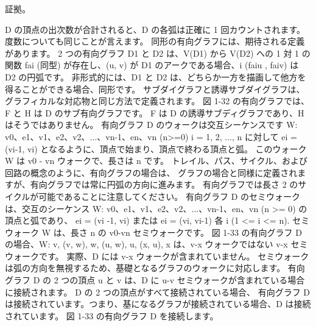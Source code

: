 
証拠。

D の頂点の出次数が合計されると、D の各弧は正確に 1 回カウントされます。 度数についても同じことが言えます。
同形の有向グラフには、期待される定義があります。 2 つの有向グラフ D1 と D2 は、V(D1) から V(D2) への 
1 対 1 の関数 fai (同型) が存在し、(u, v) が D1 のアークである場合、i (faiu , faiv) は D2 の円弧です。 
非形式的には、D1 と D2 は、どちらか一方を描画して他方を得ることができる場合、同形です。
サブダイグラフと誘導サブダイグラフは、グラフィカルな対応物と同じ方法で定義されます。 図 1-32 の有向グラフでは、F と H は D のサブ有向グラフです。 
F は D の誘導サブディグラフであり、H はそうではありません。
有向グラフ D のウォークは交互シーケンスです
W: v0、e1、v1、e2、v2、...、vn-1、en、vn (n>=0)
i = 1, 2, ..., n に対して ei = (vi-1, vi) となるように、頂点で始まり、頂点で終わる頂点と弧。 
このウォーク W は v0 - vn ウォークで、長さは n です。 トレイル、パス、サイクル、および回路の概念のように、有向グラフの場合は、
グラフの場合と同様に定義されますが、有向グラフでは常に円弧の方向に進みます。 有向グラフでは長さ 2 のサイクルが可能であることに注意してください。 
有向グラフ D のセミウォークは、交互のシーケンス W: v0、e1、v1、e2、v2、...、vn-1、en、vn (n >= 0) の頂点と弧であり、
ei = (vi -1, vi) または ei = (vi, vi-1) 各 i (1 <= i <= n). セミウォーク W は、長さ n の v0-vn セミウォークです。 
図 1-33 の有向グラフ D の場合、W: v, (v, w), w, (u, w), u, (x, u), x は、v-x ウォークではない v-x セミウォークです。 
実際、D には v-x ウォークが含まれていません。 セミウォークは弧の方向を無視するため、基礎となるグラフのウォークに対応します。
有向グラフ D の 2 つの頂点 u と v は、D に u-v セミウォークが含まれている場合に接続されます。 D の 2 つの頂点がすべて接続されている場合、
有向グラフ D は接続されています。つまり、基になるグラフが接続されている場合、D は接続されています。 図 1-33 の有向グラフ D を接続します。